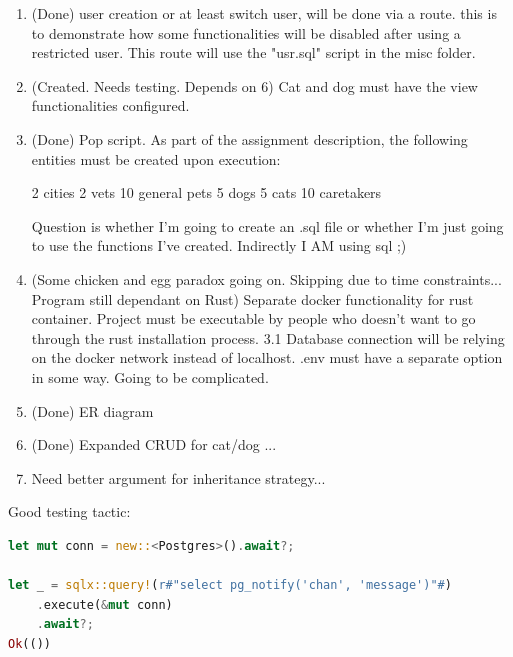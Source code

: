 \documentclass[a4paper, 12pt]{report}
\begin{document}
\begin{enumerate}
 \item (Done) user creation or at least switch user, will be done via a route. 
    this is to demonstrate how some functionalities will be disabled after using a restricted user.
    This route will use the "usr.sql" script in the misc folder.
 \item (Created. Needs testing. Depends on 6) Cat and dog must have the view functionalities configured.

 \item (Done) Pop script. As part of the assignment description, the following entities must be created upon execution:

    2 cities
    2 vets
    10 general pets
    5 dogs
    5 cats
    10 caretakers

    Question is whether I'm going to create an .sql file or whether I'm just going to use the functions I've created.
    Indirectly I AM using sql ;)
    
	\item (Some chicken and egg paradox going on. Skipping due to time constraints... Program still dependant on Rust) Separate docker functionality for rust container. Project must be executable by people who doesn't want to go through the rust installation process.
    3.1 Database connection will be relying on the docker network instead of localhost.
        .env must have a separate option in some way. Going to be complicated.
	\item (Done) ER diagram
	\item (Done) Expanded CRUD for cat/dog ...
	\item Need better argument for inheritance strategy...
\end{enumerate}


Good testing tactic:
\begin{lstlisting}[language=Rust]
let mut conn = new::<Postgres>().await?;

let _ = sqlx::query!(r#"select pg_notify('chan', 'message')"#)
    .execute(&mut conn)
    .await?;
Ok(())

\end{lstlisting}
\end{document}
